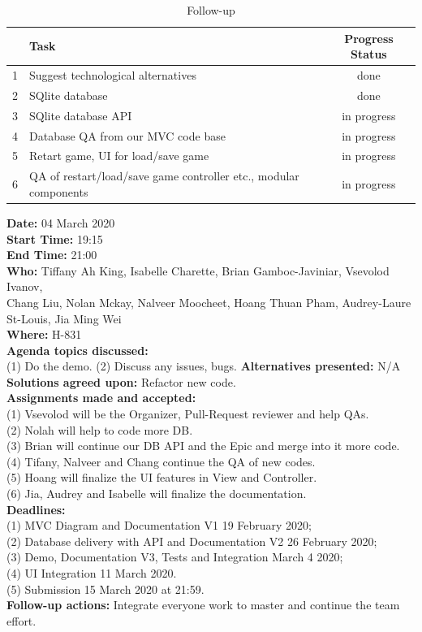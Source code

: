 \documentclass[12pt]{article}
\begin{document}
\begin{table}[h!]
\centering
 \begin{tabular}{||l l c ||} 
 \hline
   & Task & Progress Status\\ [0.5ex] 
 \hline\hline
 1 & Suggest technological alternatives & done \\
 2 & SQlite database & done\\
 3 & SQlite database API & in progress\\
 4 & Database QA from our MVC code base & in progress\\
 5 & Retart game, UI for load/save game & in progress\\
 6 & QA of restart/load/save game controller etc., modular components & in progress\\[1ex] 
 \hline
 \end{tabular}
\caption{Follow-up }
\label{table:1}
\end{table}

\newpage

{\bf Date:} 04 March 2020\\
{\bf Start Time:} 19:15\\
{\bf End Time:} 21:00\\
{\bf Who:} Tiffany Ah King, Isabelle Charette, Brian Gamboc-Javiniar, Vsevolod Ivanov,\\
Chang Liu, Nolan Mckay, Nalveer Moocheet, Hoang Thuan Pham, Audrey-Laure St-Louis, Jia Ming Wei\\
{\bf Where:} H-831\\
{\bf Agenda topics discussed:} \\
(1) Do the demo.
(2) Discuss any issues, bugs.
{\bf Alternatives presented:} N/A\\
{\bf Solutions agreed upon:} Refactor new code.\\
{\bf Assignments made and accepted:} \\
(1) Vsevolod will be the Organizer, Pull-Request reviewer and help QAs.\\
(2) Nolah will help to code more DB.\\
(3) Brian will continue our DB API and the Epic and merge into it more code.\\
(4) Tifany, Nalveer and Chang continue the QA of new codes.\\
(5) Hoang will finalize the UI features in View and Controller.\\
(6) Jia, Audrey and Isabelle will finalize the documentation.\\
{\bf Deadlines:} \\
(1) MVC Diagram and Documentation V1 19 February 2020;\\
(2) Database delivery with API and Documentation V2 26 February 2020;\\
(3) Demo, Documentation V3, Tests and Integration March 4 2020; \\
(4) UI Integration 11 March 2020. \\
(5) Submission 15 March 2020 at 21:59. \\
{\bf Follow-up actions:} Integrate everyone work to master and continue the team effort.\\
\end{document}
